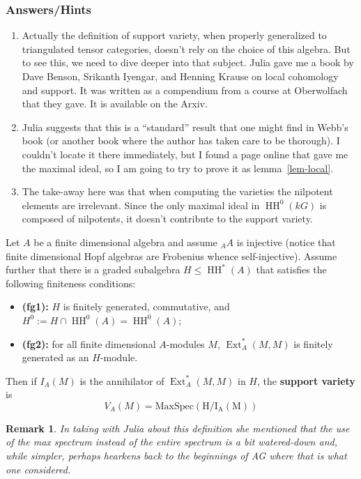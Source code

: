 \documentclass[12pt]{article}
\theoremstyle{nonumberbreak}
\theoremstyle{changebreak}
\theoremstyle{nonumberplain}
\theoremstyle{change}
\newtheorem{rmk}[thm]{Remark}
\DeclareMathOperator{\Ext}{Ext}
\DeclareMathOperator{\HH}{HH}
\begin{document}
\subsubsection{Answers/Hints}
\begin{enumerate}
	\item Actually the definition of support variety, when properly generalized to triangulated tensor categories,
	doesn't rely on the choice of this algebra. But to see this, we need to dive deeper into that subject. Julia gave 
	me a book by Dave Benson, Srikanth Iyengar, and Henning Krause on local cohomology and support. It was written
	as a compendium from a course at Oberwolfach that they gave. It is available on the Arxiv.
	\item Julia suggests that this is a ``standard'' result that one might find in Webb's book (or another book where the author has taken care to be thorough).
	I couldn't locate it there immediately, but I found a page online that gave me the maximal ideal, so I am going to try to prove it as lemma~\ref{lem-local}.
	\item The take-away here was that when computing the varieties the nilpotent elements are irrelevant. Since 
	the only maximal ideal in $\HH^0(kG)$ is composed of nilpotents, it doesn't contribute to the support variety.
\end{enumerate}

\begin{defn}\label{def-support-var}
	Let $A$ be a finite dimensional algebra and assume $_AA$ is injective (notice that finite dimensional Hopf algebras are
	Frobenius whence self-injective). Assume further that there is a graded subalgebra $H\le \HH^*(A)$ that satisfies the following 
	finiteness conditions:
	\begin{itemize}
		\item \textbf{(fg1):} $H$ is finitely generated, commutative, and $H^0:=H\cap \HH^0(A)=\HH^0(A)$;
		\item \textbf{(fg2):} for all finite dimensional $A$-modules $M$, $\Ext^*_A(M,M)$ is finitely generated as an $H$-module.
	\end{itemize}

	Then if $I_A(M)$ is the annihilator of $\Ext_A^*(M,M)$ in $H$, the \textbf{support variety} is
	\[V_A(M)=\operatorname{MaxSpec(H/I_A(M))}\]
\end{defn}
\begin{rmk}
	In taking with Julia about this definition she mentioned that the use of the max spectrum instead of the entire
	spectrum is a bit watered-down and, while simpler, perhaps hearkens back to the beginnings of AG where that is what one considered.
\end{rmk}
\end{document}
